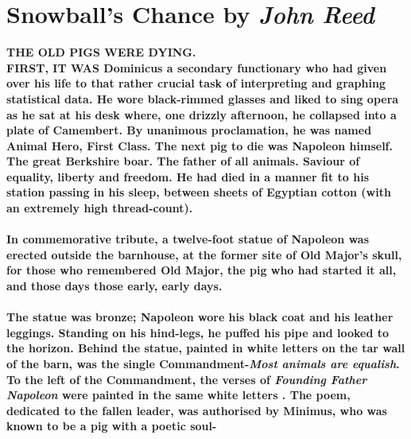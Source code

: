 \documentclass{book}
\begin{document}
\chapter*{Snowball's Chance by \textit{John Reed}}
\LARGE{\textbf{THE OLD PIGS WERE DYING.\\
		FIRST,	IT WAS Dominicus a secondary functionary who had given
	over his life to that rather crucial task of
	interpreting and graphing
statistical data. He wore black-rimmed glasses and liked to sing
opera as he sat at his desk where, one drizzly afternoon,
he collapsed into a plate of Camembert.
By unanimous proclamation, he
was named Animal Hero, First Class.
The next pig to die was
Napoleon himself. The great Berkshire boar.
The father of all animals.
Saviour of equality, liberty and freedom. He had died in
a manner fit to his station passing in his
sleep, between sheets of Egyptian
cotton (with an extremely high thread-count).\\\\
In commemorative tribute, a twelve-foot statue of Napoleon was
erected outside the barnhouse, at the former site of Old Major's
skull, for those who remembered Old Major, the pig who had
started it all, and those days those early, early days.\\\\
The statue was bronze; Napoleon wore his black coat and his leather
leggings. Standing on his hind-legs, he puffed his pipe
and looked to the horizon. Behind the statue, painted in white letters
on the tar wall of the barn, was the single Commandment-\textit{Most animals
are equalish}. To the left of the Commandment, the verses of
\textit{Founding Father Napoleon} were painted in the same white letters
. The poem, dedicated to the fallen leader, was authorised by Minimus,
who was known to be a pig with a poetic soul-\\\\}}
\end{document}
